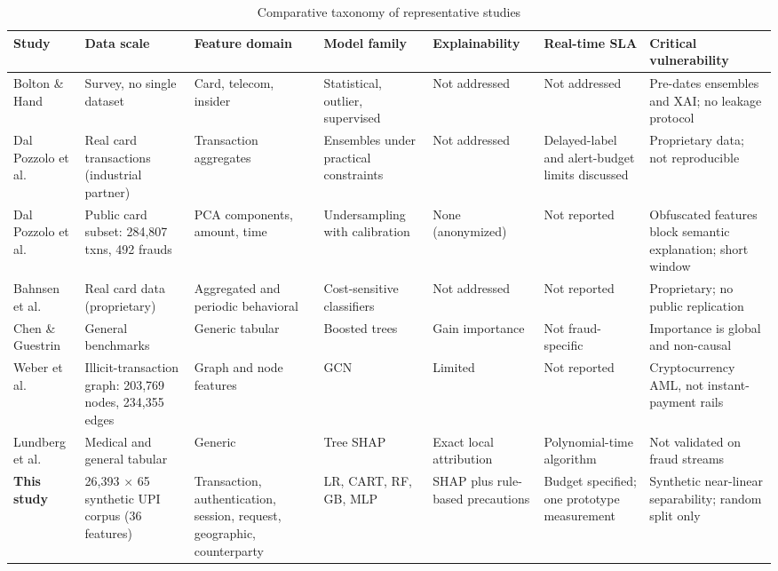\documentclass[conference]{IEEEtran}
\newcommand{\tabfont}{\footnotesize}
\begin{document}
\begin{table}[!t]
\caption{Comparative taxonomy of representative studies}\label{tab:taxonomy}
\centering\tabfont
\begin{tabularx}{\textwidth}{@{}l Y Y Y Y Y Y@{}}
\toprule
\textbf{Study} & \textbf{Data scale} & \textbf{Feature domain} & \textbf{Model family} & \textbf{Explainability} & \textbf{Real-time SLA} & \textbf{Critical vulnerability}\\
\midrule
Bolton \& Hand~\cite{bolton02} & Survey, no single dataset & Card, telecom, insider & Statistical, outlier, supervised & Not addressed & Not addressed & Pre-dates ensembles and XAI; no leakage protocol\\
Dal Pozzolo et al.~\cite{dalpozzolo14} & Real card transactions (industrial partner) & Transaction aggregates & Ensembles under practical constraints & Not addressed & Delayed-label and alert-budget limits discussed & Proprietary data; not reproducible\\
Dal Pozzolo et al.~\cite{dalpozzolo15} & Public card subset: 284,807 txns, 492 frauds & PCA components, amount, time & Undersampling with calibration & None (anonymized) & Not reported & Obfuscated features block semantic explanation; short window\\
Bahnsen et al.~\cite{bahnsen16} & Real card data (proprietary) & Aggregated and periodic behavioral & Cost-sensitive classifiers & Not addressed & Not reported & Proprietary; no public replication\\
Chen \& Guestrin~\cite{chen16} & General benchmarks & Generic tabular & Boosted trees & Gain importance & Not fraud-specific & Importance is global and non-causal\\
Weber et al.~\cite{weber19} & Illicit-transaction graph: 203,769 nodes, 234,355 edges & Graph and node features & GCN & Limited & Not reported & Cryptocurrency AML, not instant-payment rails\\
Lundberg et al.~\cite{lundberg20} & Medical and general tabular & Generic & Tree SHAP & Exact local attribution & Polynomial-time algorithm & Not validated on fraud streams\\
\textbf{This study} & 26,393 $\times$ 65 synthetic UPI corpus (36 features) & Transaction, authentication, session, request, geographic, counterparty & LR, CART, RF, GB, MLP & SHAP plus rule-based precautions & Budget specified; one prototype measurement & Synthetic near-linear separability; random split only\\
\bottomrule
\end{tabularx}
\end{table}
\end{document}

